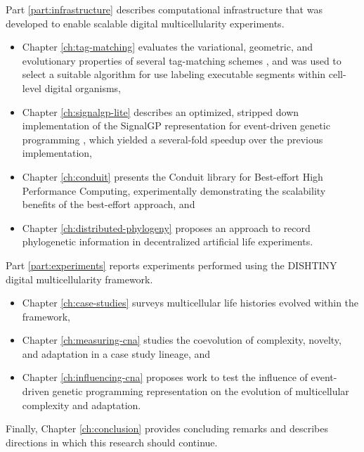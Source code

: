 Part \ref{part:infrastructure} describes computational infrastructure that was developed to enable scalable digital multicellularity experiments.
\begin{itemize}
\item Chapter \ref{ch:tag-matching} evaluates the variational, geometric, and evolutionary properties of several tag-matching schemes \citep{lalejini2018evolving}, and was used to select a suitable algorithm for use labeling executable segments within cell-level digital organisms,
\item Chapter \ref{ch:signalgp-lite} describes an optimized, stripped down implementation of the SignalGP representation for event-driven genetic programming \citep{lalejini2018evolving}, which yielded a several-fold speedup over the previous implementation,
\item Chapter \ref{ch:conduit} presents the Conduit library for Best-effort High Performance Computing, experimentally demonstrating the scalability benefits of the best-effort approach, and
\item Chapter \ref{ch:distributed-phylogeny} proposes an approach to record phylogenetic information in decentralized artificial life experiments.
\end{itemize}

Part \ref{part:experiments} reports experiments performed using the DISHTINY digital multicellularity framework.
\begin{itemize}
\item Chapter \ref{ch:case-studies} surveys multicellular life histories evolved within the framework,
\item Chapter \ref{ch:measuring-cna} studies the coevolution of complexity, novelty, and adaptation in a case study lineage, and
\item Chapter \ref{ch:influencing-cna} proposes work to test the influence of event-driven genetic programming representation on the evolution of multicellular complexity and adaptation.
\end{itemize}

Finally, Chapter \ref{ch:conclusion} provides concluding remarks and describes directions in which this research should continue.

